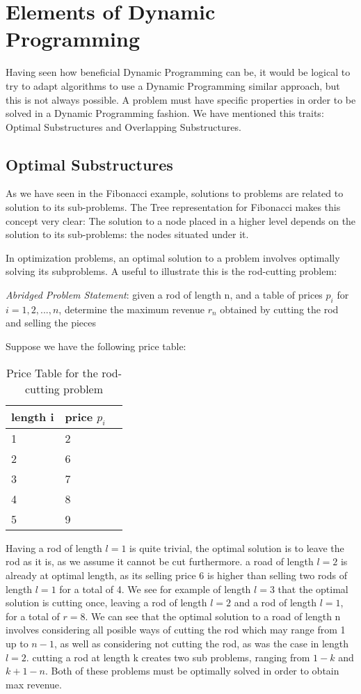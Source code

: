 \section{Elements of Dynamic Programming}

Having seen how beneficial Dynamic Programming can be, it would be logical to
try to adapt algorithms to use a Dynamic Programming similar approach, but this is not always possible.
A problem must have specific properties in order to be solved in a Dynamic Programming fashion. We have
mentioned this traits: Optimal Substructures and Overlapping Substructures.

\subsection{Optimal Substructures}

As we have seen in the Fibonacci example, solutions to problems are 
related to solution to its sub-problems. The Tree representation for Fibonacci 
makes this concept very clear: The solution to a node placed in a higher 
level depends on the solution to its sub-problems: the nodes situated under it.

In optimization problems, an optimal solution to a problem involves optimally
solving its subproblems. A useful to illustrate this is the rod-cutting problem:

\indent \emph{Abridged Problem Statement}: given a rod of length n, and a table of prices $p_i$ for $i = 1, 2, ..., n$,
determine the maximum revenue $r_n$ obtained by cutting the rod and selling the pieces \cite{cormen2009introduction}

Suppose we have the following price table:
\begin{table}[ht]
\centering
\begin{tabular}{l|ll}
  \textbf{length i}&\textbf{price $p_i$}\\\hline
  1 & 2\\
  2 & 6\\
  3 & 7\\
  4 & 8\\
  5 & 9
\end{tabular}
\caption{Price Table for the rod-cutting problem}
\label{fig:priceforrods}
\end{table}

Having a rod of length $l = 1$ is quite trivial, the optimal solution is to leave the rod as it is, as we 
assume it cannot be cut furthermore. a road of length $l = 2$ is already at optimal length,
as its selling price 6 is higher than selling two rods of length $l = 1$ for a total of 4.
We see for example of length $l = 3$ that the optimal solution is cutting once, leaving
a rod of length $l = 2$ and a rod of length $l = 1$, for a total of $r = 8$. We can see that the optimal
solution to a road of length n involves considering  all posible ways of cutting the rod which
may range from 1 up to $n - 1$, as well as considering not cutting the rod, as was the case in length
$l = 2$. cutting a rod at length k creates two sub problems, ranging from 
$1 - k$ and $k+1 - n$. Both of these problems must be optimally solved in order to obtain max revenue.

